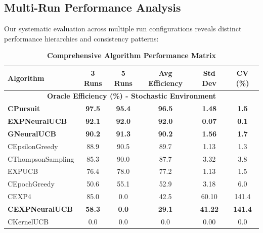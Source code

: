 \documentclass[12pt,a4paper]{article}
\newcommand{\performance}[1]{\textcolor{performancecolor}{\textbf{#1}}}
\newcommand{\critical}[1]{\textcolor{criticalcolor}{\textbf{#1}}}
\begin{document}
\begin{tcolorbox}[colback=performancecolor!10,colframe=performancecolor,title=\textbf{Primary Experimental Findings}]

\subsection{Multi-Run Performance Analysis}

Our systematic evaluation across multiple run configurations reveals distinct performance hierarchies and consistency patterns:

\begin{table}[H]
\centering
\caption{\performance{Comprehensive Algorithm Performance Matrix}}
\begin{tabular}{|l|c|c|c|c|c|}
\hline
\textbf{Algorithm} & \textbf{3 Runs} & \textbf{5 Runs} & \textbf{Avg Efficiency} & \textbf{Std Dev} & \textbf{CV (\%)} \\
\hline
\hline
\multicolumn{6}{|c|}{\textbf{Oracle Efficiency (\%) - Stochastic Environment}} \\
\hline
\performance{CPursuit} & \performance{97.5} & \performance{95.4} & \performance{\textbf{96.5}} & \performance{1.48} & \performance{\textbf{1.5}} \\
\performance{EXPNeuralUCB} & \performance{92.1} & \performance{92.0} & \performance{92.0} & \performance{0.07} & \performance{\textbf{0.1}} \\
\performance{GNeuralUCB} & \performance{90.2} & \performance{91.3} & \performance{90.2} & \performance{1.56} & \performance{\textbf{1.7}} \\
CEpsilonGreedy & 88.9 & 90.5 & 89.7 & 1.13 & 1.3 \\
CThompsonSampling & 85.3 & 90.0 & 87.7 & 3.32 & 3.8 \\
EXPUCB & 76.4 & 78.0 & 77.2 & 1.13 & 1.5 \\
CEpochGreedy & 50.6 & 55.1 & 52.9 & 3.18 & 6.0 \\
CEXP4 & 85.0 & 0.0 & 42.5 & 60.10 & 141.4 \\
\critical{CEXPNeuralUCB} & \critical{58.3} & \critical{0.0} & \critical{29.1} & \critical{41.22} & \critical{141.4} \\
CKernelUCB & 0.0 & 0.0 & 0.0 & 0.00 & 0.0 \\
\hline
\end{tabular}
\end{table}

\end{tcolorbox}
\end{document}
